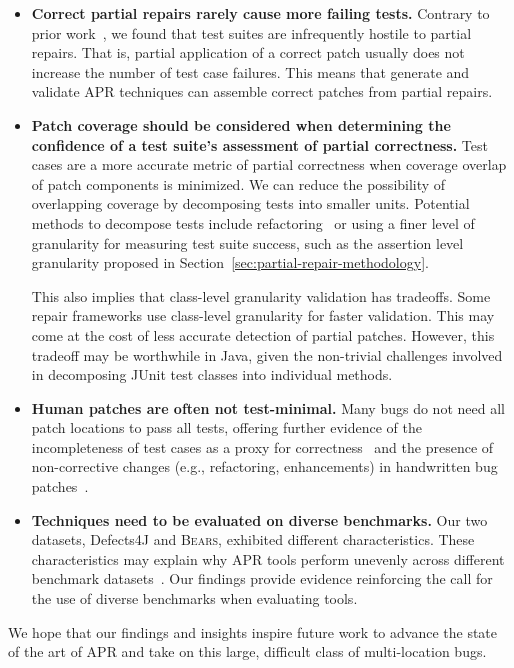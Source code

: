 \documentclass[10pt, conference]{IEEEtran}
\newcommand\bears{\textsc{Bears}\xspace}
\begin{document}
\begin{itemize}[wide, labelindent=0pt]
\item\textbf{Correct partial repairs rarely cause more failing tests.}
Contrary to prior work~\cite{gecco09}, we found that test suites are infrequently
hostile to partial repairs. That is, partial application of a correct patch
usually does not increase the number of test case failures. This means that
generate and validate APR techniques can assemble correct patches from partial repairs.

\item\textbf{Patch coverage should be considered when determining the
  confidence of a test suite's assessment of partial correctness.}
Test cases are a more accurate metric of partial correctness when coverage
overlap of patch components is minimized.
We can reduce the possibility of overlapping coverage by decomposing tests into
smaller units. Potential methods to decompose tests include
refactoring~\cite{b-refactoring} or using a finer level of granularity for
measuring test suite success, such as the assertion level granularity proposed
in Section~\ref{sec:partial-repair-methodology}.

This also implies that class-level granularity validation has tradeoffs. Some
repair frameworks use class-level granularity for faster validation. This may
come at the cost of less accurate detection of partial patches. However, this
tradeoff may be worthwhile in Java, given the non-trivial challenges involved in
decomposing JUnit test classes into individual methods.

\item\textbf{Human patches are often not test-minimal.}
Many bugs do not need all patch locations to pass all tests,
offering further evidence of the incompleteness of test cases as a
proxy for correctness~\cite{patch-correctness} and the
presence of non-corrective changes (e.g., refactoring, enhancements)
in handwritten bug patches~\cite{api-refactoring, tangledchanges}.

\item\textbf{Techniques need to be evaluated on diverse benchmarks.}
Our two datasets, Defects4J and \bears, exhibited different characteristics.
These characteristics may explain why APR tools perform unevenly across
different benchmark datasets~\cite{durieux-repair-them-all}. Our findings
provide evidence reinforcing the call for the use of diverse benchmarks when
evaluating tools.
\end{itemize}

We hope that our findings and insights inspire future work to advance 
the state of the art of APR and take on this large, difficult class of 
multi-location bugs.
\end{document}
